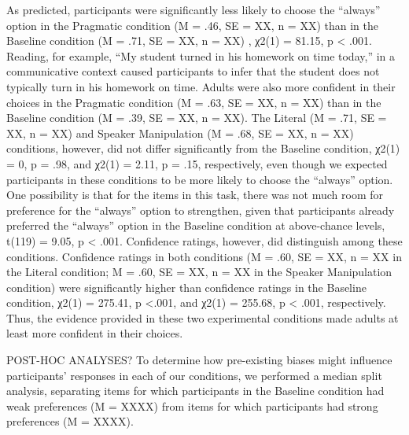 \documentclass[10pt,letterpaper]{article}
\begin{document}
	As predicted, participants were significantly less likely to choose the “always” option in the Pragmatic condition (M = .46, SE = XX, n = XX) than in the Baseline condition (M = .71, SE = XX, n = XX) , χ2(1) = 81.15, p < .001.  Reading, for example, “My student turned in his homework on time today,” in a communicative context caused participants to infer that the student does not typically turn in his homework on time.  Adults were also more confident in their choices in the Pragmatic condition (M = .63, SE = XX, n = XX) than in the Baseline condition (M = .39, SE = XX, n = XX).
The Literal (M = .71, SE = XX, n = XX) and Speaker Manipulation (M = .68,  SE = XX, n = XX) conditions, however, did not differ significantly from the Baseline condition, χ2(1) = 0, p = .98, and χ2(1) = 2.11, p = .15, respectively, even though we expected participants in these conditions to be more likely to choose the “always” option.  One possibility is that for the items in this task, there was not much room for preference for the “always” option to strengthen, given that participants already preferred the “always” option in the Baseline condition at above-chance levels, t(119) = 9.05, p < .001.  Confidence ratings, however, did distinguish among these conditions.  Confidence ratings in both conditions (M = .60, SE = XX, n = XX in the Literal condition; M = .60, SE = XX, n = XX in the Speaker Manipulation condition) were significantly higher than confidence ratings in the Baseline condition,  χ2(1) = 275.41, p <.001, and χ2(1) = 255.68, p < .001, respectively.  Thus, the evidence provided in these two experimental conditions made adults at least more confident in their choices.  

POST-HOC ANALYSES?
To determine how pre-existing biases might influence participants’ responses in each of our conditions, we performed a median split analysis, separating items for which participants in the Baseline condition had weak preferences (M  = XXXX) from items for which participants had strong preferences (M = XXXX).  




\setlength{\bibleftmargin}{.125in}
\setlength{\bibindent}{-\bibleftmargin}


\end{document}
